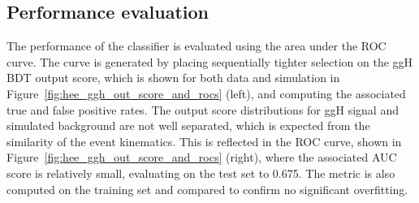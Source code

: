 \subsection{Performance evaluation} 

The performance of the classifier is evaluated using the area under the ROC curve. The curve is generated by placing sequentially tighter selection on the ggH BDT output score, which is shown for both data and simulation in Figure~\ref{fig:hee_ggh_out_score_and_rocs} (left), and computing the associated true and false positive rates.
The output score distributions for ggH signal and simulated background are not well separated, which is expected from the similarity of the event kinematics.
This is reflected in the ROC curve, shown in Figure~\ref{fig:hee_ggh_out_score_and_rocs} (right), where the associated AUC score is relatively small, evaluating on the test set to 0.675.
The metric is also computed on the training set and compared to confirm no significant overfitting. %

